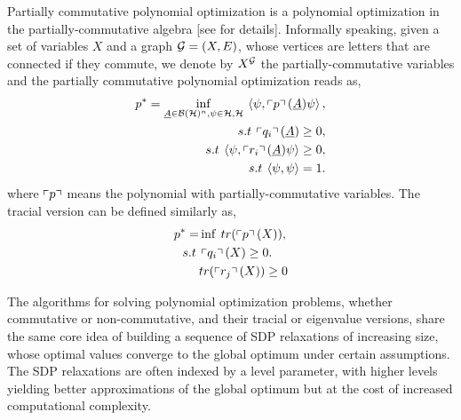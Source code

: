 Partially commutative polynomial optimization is a polynomial optimization in the partially-commutative algebra [see \cite{} for details]. Informally speaking, given a set of variables $X$ and a graph $\mathcal G=(X,E)$, whose vertices are letters that are connected if they commute, we denote by $X^\mathcal G$ the partially-commutative variables and the partially commutative polynomial optimization reads as,
\begin{equation}
  \label{eq:pcpop}
\begin{split}
       p^* =\underset{\underline{A} \in \mathcal{B}(\mathcal{H})^n, \psi \in \mathcal{H}, \mathcal{H}}{\inf} \: \braket{\psi,\left\ulcorner p \right\urcorner(\underline{A}) \psi}, \\
    s.t \: \left\ulcorner q_i \right\urcorner(\underline{A}) \geq 0, \\
    s.t \: \braket{\psi ,\left\ulcorner r_i \right\urcorner(\underline{A}) \psi} \geq 0, \\
    s.t \: \braket{\psi , \psi} = 1. \\ 
\end{split}
\end{equation}
where $\left\ulcorner p \right\urcorner$ means the polynomial with partially-commutative variables. The tracial version can be defined similarly as,
\begin{equation}
  \label{eq:tpop}
\begin{split}
       p^* =& \inf \: tr(\left\ulcorner p \right\urcorner(X)), \\
    s.t \: & \left\ulcorner q_i \right\urcorner(X) \geq 0. \\
     & tr(\left\ulcorner r_j \right\urcorner(X)) \geq 0
\end{split}
\end{equation}

The algorithms for solving polynomial optimization problems, whether commutative or non-commutative, and their tracial or eigenvalue versions, share the same core idea of building a sequence of SDP relaxations of increasing size, whose optimal values converge to the global optimum under certain assumptions.  The SDP relaxations are often indexed by a level parameter, with higher levels yielding better approximations of the global optimum but at the cost of increased computational complexity.

